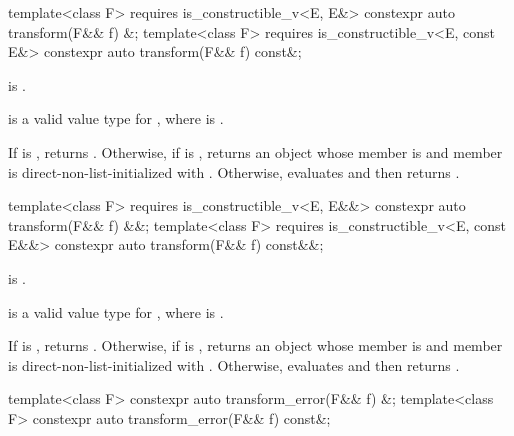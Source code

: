 %
\begin{itemdecl}
template<class F>
  requires is_constructible_v<E, E&>
constexpr auto transform(F&& f) &;
template<class F>
  requires is_constructible_v<E, const E&>
constexpr auto transform(F&& f) const&;
\end{itemdecl}

\begin{itemdescr}
\pnum
\constraints
{} is .

\pnum
\mandates
{} is a valid value type for , where  is .

\pnum
\effects
If  is , returns . Otherwise, if  is , returns an  object whose  member is  and  member is direct-non-list-initialized with . Otherwise, evaluates  and then returns .
\end{itemdescr}

%
\begin{itemdecl}
template<class F>
  requires is_constructible_v<E, E&&>
constexpr auto transform(F&& f) &&;
template<class F>
  requires is_constructible_v<E, const E&&>
constexpr auto transform(F&& f) const&&;
\end{itemdecl}

\begin{itemdescr}
\pnum
\constraints
{} is .

\pnum
\mandates
{} is a valid value type for , where  is .

\pnum
\effects
If  is , returns . Otherwise, if  is , returns an  object whose  member is  and  member is direct-non-list-initialized with . Otherwise, evaluates  and then returns .
\end{itemdescr}

%
\begin{itemdecl}
template<class F> constexpr auto transform_error(F&& f) &;
template<class F> constexpr auto transform_error(F&& f) const&;
\end{itemdecl}


